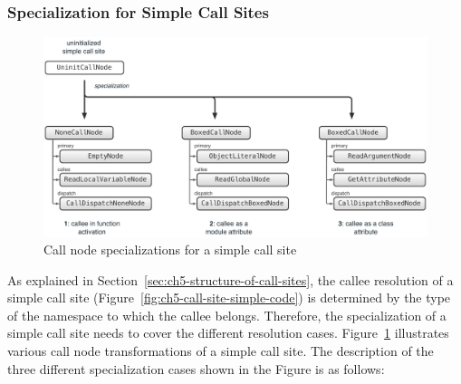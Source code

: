 \subsubsection{Specialization for Simple Call Sites}

\begin{figure}
\centering
\includegraphics[scale=.5]{figures/ch5-call-node-specialization-simple}
\caption{Call node specializations for a simple call site}
\label{fig:ch5-call-node-specialization-simple}
\end{figure}

As explained in Section~\ref{sec:ch5-structure-of-call-sites}, the callee resolution of a simple call site (Figure~\ref{fig:ch5-call-site-simple-code}) is determined by the type of the namespace to which the callee belongs.
Therefore, the specialization of a simple call site needs to cover the different resolution cases.
Figure~\ref{fig:ch5-call-node-specialization-simple} illustrates various call node transformations of a simple call site.
The description of the three different specialization cases shown in the Figure is as follows:

